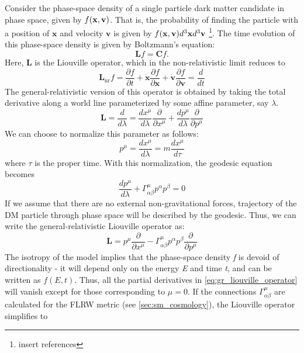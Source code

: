 Consider the phase-space density of a single particle dark matter candidate in phase space, given by $f(\mathbf{x},\mathbf{v})$. That is, the probability of finding the particle with a position of $\mathbf{x}$ and velocity $\mathbf{v}$ is given by $f(\mathbf{x},\mathbf{v}) d^3\mathbf{x}d^3\mathbf{v}$ \footnote{insert references}.
The time evolution of this phase-space density is given by Boltzmann's equation:
\begin{equation}
  \mathbf{L}f = \mathbf{C}f.
\end{equation}
Here, $\mathbf{L}$ is the Liouville operator, which in the non-relativistic limit reduces to 
\begin{equation}
  \mathbf{L}_\text{nr}f = \frac{\partial f}{\partial t} + \mathbf{\dot{x}}\frac{\partial f}{\partial\mathbf{x}} + \mathbf{\dot{v}}\frac{\partial f}{\partial \mathbf{v}} = \frac{d}{dt}
\end{equation}
The general-relativistic version of this operator is obtained by taking the total derivative along a world line parameterized by some affine parameter, say  $\lambda$.
\begin{equation}
  \mathbf{L} = \frac{d}{d\lambda} = \frac{dx^\mu}{d\lambda}\frac{\partial}{\partial x^\mu} + \frac{dp^\mu}{d\lambda}\frac{\partial}{\partial p^\mu}
\end{equation}
We can choose to normalize this parameter as follows:
\begin{equation}
  p^\mu = \frac{dx^\mu}{d\lambda} = m\frac{dx^\mu}{d\tau}
\end{equation}
where $\tau$ is the proper time. With this normalization, the geodesic equation becomes
\begin{equation}
  \frac{dp^\mu}{d\lambda}+\Gamma^{\mu}_{\alpha\beta}p^\alpha p^\beta = 0
\end{equation}
If we assume that there are no external non-gravitational forces, trajectory of the DM particle through phase space will be described by the geodesic. Thus, we can write the general-relativistic Liouville operator as:
\begin{equation}\label{eq:gr_liouville_operator}
  \mathbf{L} = p^\mu\frac{\partial}{\partial x^\mu} - \Gamma^\mu_{\alpha\beta}p^\alpha p^\beta\frac{\partial}{\partial p^\mu}
\end{equation}
The isotropy of the model implies that the phase-space density \emph{f} is devoid of directionality - it will depend only on the energy \emph{E} and time \emph{t}, and can be written as $f(E,t)$. Thus, all the partial derivatives in \autoref{eq:gr_liouville_operator} will vanish except for those corresponding to $\mu = 0$. If the connections $\Gamma^\mu_{\alpha\beta}$ are calculated for the FLRW metric (see \autoref{sec:sm_cosmology}), the Liouville operator simplifies to
